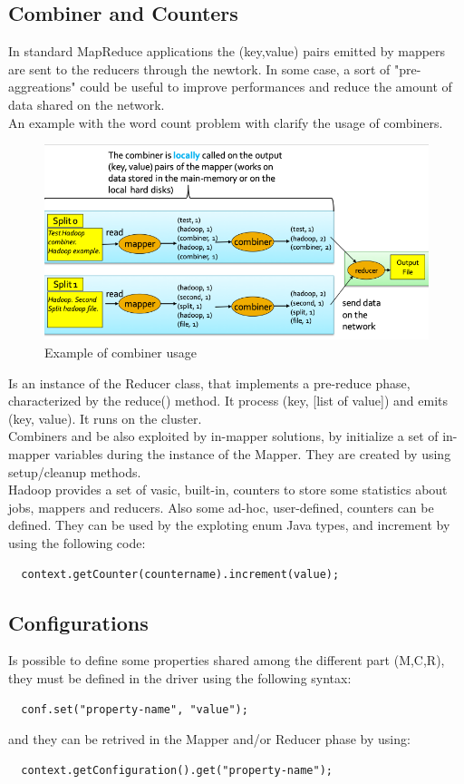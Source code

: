 \documentclass[12pt]{article}
\begin{document}
\subsection{Combiner and Counters}
In standard MapReduce applications the (key,value) pairs emitted by mappers are sent to the reducers through the newtork. In some case, a sort of "pre-aggreations" could be useful to improve performances and reduce the amount of data shared on the network.\\
An example with the word count problem with clarify the usage of combiners.
\begin{figure}[H]
  \includegraphics[width=\linewidth]{images/combiners.png}
  \caption{Example of combiner usage}
  \label{fig:cobiners}
\end{figure}
Is an instance of the Reducer class, that implements a pre-reduce phase, characterized by the reduce() method. It process (key, [list of value]) and emits (key, value). It runs on the cluster.\\
Combiners and be also exploited by in-mapper solutions, by initialize a set of in-mapper variables during the instance of the Mapper. They are created by using setup/cleanup methods.\\
Hadoop provides a set of vasic, built-in, counters to store some statistics about jobs, mappers and reducers. Also some ad-hoc, user-defined, counters can be defined. They can be used by the exploting enum Java types, and increment by using the following code:
\begin{lstlisting}
  context.getCounter(countername).increment(value);
\end{lstlisting}

\subsection{Configurations}
Is possible to define some properties shared among the different part (M,C,R), they must be defined in the driver using the following syntax:
\begin{lstlisting}
  conf.set("property-name", "value");
\end{lstlisting}
and they can be retrived in the Mapper and/or Reducer phase by using:
\begin{lstlisting}
  context.getConfiguration().get("property-name");
\end{lstlisting}
\end{document}
